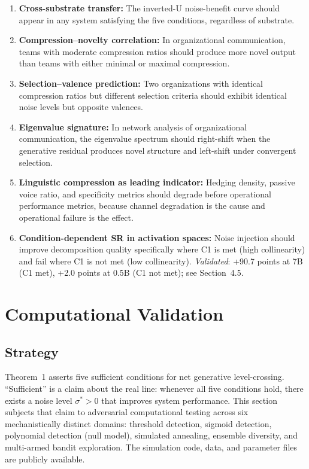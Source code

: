 \documentclass[12pt,letterpaper]{article}
\theoremstyle{definition}
\theoremstyle{remark}
\begin{document}
\begin{enumerate}
    \item \textbf{Cross-substrate transfer:} The inverted-U noise-benefit curve should appear in any system satisfying the five conditions, regardless of substrate.
    \item \textbf{Compression--novelty correlation:} In organizational communication, teams with moderate compression ratios should produce more novel output than teams with either minimal or maximal compression.
    \item \textbf{Selection--valence prediction:} Two organizations with identical compression ratios but different selection criteria should exhibit identical noise levels but opposite valences.
    \item \textbf{Eigenvalue signature:} In network analysis of organizational communication, the eigenvalue spectrum should right-shift when the generative residual produces novel structure and left-shift under convergent selection.
    \item \textbf{Linguistic compression as leading indicator:} Hedging density, passive voice ratio, and specificity metrics should degrade before operational performance metrics, because channel degradation is the cause and operational failure is the effect.
    \item \textbf{Condition-dependent SR in activation spaces:} Noise injection should improve decomposition quality specifically where C1 is met (high collinearity) and fail where C1 is not met (low collinearity). \emph{Validated}: +90.7 points at 7B (C1 met), +2.0 points at 0.5B (C1 not met); see Section~4.5.
\end{enumerate}


\section{Computational Validation}
\label{sec:computation}

\subsection{Strategy}

Theorem~1 asserts five sufficient conditions for net generative level-crossing. ``Sufficient'' is a claim about the real line: whenever all five conditions hold, there exists a noise level $\sigma^* > 0$ that improves system performance. This section subjects that claim to adversarial computational testing across six mechanistically distinct domains: threshold detection, sigmoid detection, polynomial detection (null model), simulated annealing, ensemble diversity, and multi-armed bandit exploration. The simulation code, data, and parameter files are publicly available.
\end{document}
